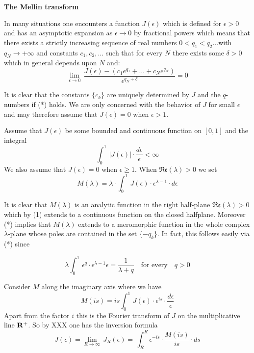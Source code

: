 \newpage


\centerline{\bf \large The Mellin transform}

\bigskip

\noindent
In many situations one encounters a
function $J(\epsilon)$ which is defined for $\epsilon>0$
and has an asymptotic expansion as $\epsilon\to 0$ by
fractional powers which  means  that there
exists a strictly increasing sequence of real numbers
$0<q_1<q_2\ldots$with $q_N\to +\infty$
and constants $c_1,c_2,\ldots$
such that for every $N$ there exists some $\delta>0$ 
which in general depends upon $N$ and:
\[
\lim_{\epsilon\to 0}\,
\frac{J(\epsilon)-(c_1e^{q_1}+\ldots +c_Ne^{q_N})}
{\epsilon^{q_N+\delta}}= 0\tag{*}
\] 

\noindent
It is clear that the constants $\{c_k\}$ are uniquely determined 
by $J$ and the $q$-numbers if (*) holds.
We are only concerned with the behavior of $J$ for small $\epsilon$
and may therefore assume that $J(\epsilon)=0$ when $\epsilon>1$.

\medskip

Assume that  $J(\epsilon)$ be some bounded and continuous function on
$[0,1]$  and  the integral
\[ 
\int_0^1\, |J(\epsilon)|\cdot \frac{d\epsilon}{\epsilon}<\infty\tag{1}
\]
We also assume that $J(\epsilon)=0$ when $\epsilon\geq 1$.
When $\mathfrak{Re}(\lambda)>0$ we set
\[
 M(\lambda)=\lambda\cdot \int_0^1\, J(\epsilon)\cdot \epsilon^{\lambda-1}\cdot d\epsilon\tag{2}
\]

\noindent
It is clear that $M(\lambda)$ is an analytic function in the right
half-plane $\mathfrak{Re}(\lambda)>0$ which by (1) extends to a continuous function
on the closed half\vvv plane. Moreover
(*) implies  that
$ M(\lambda)$ extends to a meromorphic function in the whole complex
$\lambda$-plane whose  poles are contained in the set
$\{-q_k\}$. In fact, this follows easily via (*) since

\[
\lambda\int_0^1\, \epsilon^q\cdot  \epsilon^{\lambda-1}\epsilon=
\frac{1}{\lambda+q}\quad\text{for every}\quad q>0
\] \medskip

\noindent
Consider  $M$ along the imaginary axis where we have
\[
M(is)=is\int_0^1\, J(\epsilon)\cdot \epsilon^{is}\cdot 
\frac{d\epsilon}{\epsilon}\tag{3}
\]
Apart from the factor $i$ this is the Fourier transform of 
$J$ on  the multiplicative line ${\bf{R}}^+$.
So by XXX one has  the inversion formula
\[ 
J(\epsilon)=\lim_{R\to\infty}\, J_R(\epsilon)=
\,\int_R^R\epsilon^{-is}\cdot
\frac{ M(is)}{is}\cdot ds\tag{4}
\]
\medskip




